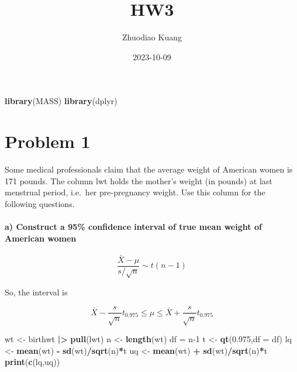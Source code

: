 \documentclass[
]{article}
\title{HW3}
\author{Zhuodiao Kuang}
\date{2023-10-09}
\newenvironment{Shaded}{\begin{snugshade}}{\end{snugshade}}
\newcommand{\AttributeTok}[1]{\textcolor[rgb]{0.13,0.29,0.53}{#1}}
\newcommand{\DecValTok}[1]{\textcolor[rgb]{0.00,0.00,0.81}{#1}}
\newcommand{\FloatTok}[1]{\textcolor[rgb]{0.00,0.00,0.81}{#1}}
\newcommand{\FunctionTok}[1]{\textcolor[rgb]{0.13,0.29,0.53}{\textbf{#1}}}
\newcommand{\NormalTok}[1]{#1}
\newcommand{\OtherTok}[1]{\textcolor[rgb]{0.56,0.35,0.01}{#1}}
\newcommand{\SpecialCharTok}[1]{\textcolor[rgb]{0.81,0.36,0.00}{\textbf{#1}}}
\begin{document}
\maketitle

\begin{Shaded}
\begin{Highlighting}[]
\FunctionTok{library}\NormalTok{(MASS)}
\FunctionTok{library}\NormalTok{(dplyr)}
\end{Highlighting}
\end{Shaded}

\hypertarget{problem-1}{%
\section{Problem 1}\label{problem-1}}

Some medical professionals claim that the average weight of American
women is 171 pounds. The column lwt holds the mother's weight (in
pounds) at last menstrual period, i.e.~her pre-pregnancy weight. Use
this column for the following questions.

\hypertarget{a-construct-a-95-confidence-interval-of-true-mean-weight-of-american-women}{%
\paragraph{a) Construct a 95\% confidence interval of true mean weight
of American
women}\label{a-construct-a-95-confidence-interval-of-true-mean-weight-of-american-women}}

\[\frac{\bar{X}-\mu}{s/\sqrt{n}} \sim t(n-1)\]

So, the interval is

\[\bar{X}-\frac{s}{\sqrt{n}}t_{0.975} \le \mu \le \bar{X}+\frac{s}{\sqrt{n}}t_{0.975}\]

\begin{Shaded}
\begin{Highlighting}[]
\NormalTok{wt }\OtherTok{\textless{}{-}}\NormalTok{ birthwt }\SpecialCharTok{|\textgreater{}} \FunctionTok{pull}\NormalTok{(lwt)}
\NormalTok{n }\OtherTok{\textless{}{-}} \FunctionTok{length}\NormalTok{(wt)}
\NormalTok{df }\OtherTok{=}\NormalTok{ n}\DecValTok{{-}1}
\NormalTok{t }\OtherTok{\textless{}{-}} \FunctionTok{qt}\NormalTok{(}\FloatTok{0.975}\NormalTok{,}\AttributeTok{df =}\NormalTok{ df)}
\NormalTok{lq }\OtherTok{\textless{}{-}} \FunctionTok{mean}\NormalTok{(wt) }\SpecialCharTok{{-}} \FunctionTok{sd}\NormalTok{(wt)}\SpecialCharTok{/}\FunctionTok{sqrt}\NormalTok{(n)}\SpecialCharTok{*}\NormalTok{t}
\NormalTok{uq }\OtherTok{\textless{}{-}} \FunctionTok{mean}\NormalTok{(wt) }\SpecialCharTok{+} \FunctionTok{sd}\NormalTok{(wt)}\SpecialCharTok{/}\FunctionTok{sqrt}\NormalTok{(n)}\SpecialCharTok{*}\NormalTok{t}
\FunctionTok{print}\NormalTok{(}\FunctionTok{c}\NormalTok{(lq,uq))}
\end{Highlighting}
\end{Shaded}
\end{document}
